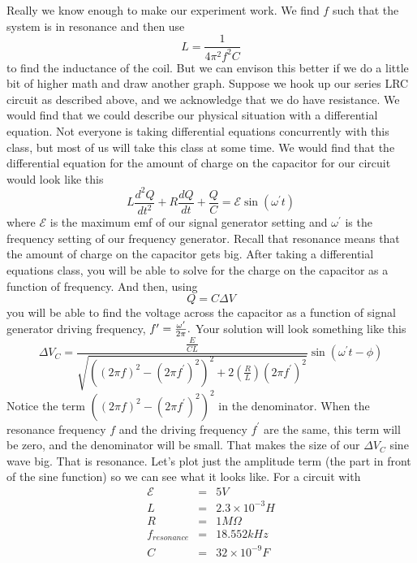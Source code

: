 Really we know enough to make our experiment work. We find $f$ such that
the system is in resonance and then use 
\begin{equation*}
L=\frac{1}{4\pi ^{2}f^{2}C}
\end{equation*}%
to find the inductance of the coil. But we can envison this better if we do
a little bit of higher math and draw another graph. Suppose we hook up our
series LRC circuit as described above, and we acknowledge that we do have
resistance. We would find that we could describe our physical situation with
a differential equation. Not everyone is taking differential equations
concurrently with this class, but most of us will take this class at
some time. We would find that the differential equation for the amount of
charge on the capacitor for our circuit would look like this%
\begin{equation*}
L\frac{d^{2}Q}{dt^{2}}+R\frac{dQ}{dt}+\frac{Q}{C}=\mathcal{E}\sin \left(
\omega ^{\prime }t\right)
\end{equation*}%
where $\mathcal{E}$ is the maximum emf of our signal generator setting and $%
\omega ^{\prime }$ is the frequency setting of our frequency generator. Recall
that resonance means that the amount of charge on the capacitor gets big.
After taking a differential equations class, you will be able to solve for
the charge on the capacitor as a function of frequency. And then, using 
\begin{equation*}
Q=C\Delta V
\end{equation*}%
you will be able to find the voltage across the capacitor as a function of
signal generator driving frequency, $f^{\prime }=\frac{\omega ^{\prime }}{%
2\pi }.$ Your solution will look something like this 
\begin{equation*}
\Delta V_{C}=\frac{\frac{E}{CL}}{\sqrt{\left( \left( 2\pi f
\right) ^{2}-\left( 2\pi f^{\prime }\right) ^{2}\right) ^{2}+2\left( \frac{R%
}{L}\right) \left( 2\pi f^{\prime }\right) ^{2}}}\sin \left( \omega ^{\prime
}t-\phi \right)
\end{equation*}%
Notice the term $\left( \left( 2\pi f\right) ^{2}-\left( 2\pi
f^{\prime }\right) ^{2}\right) ^{2}$ in the denominator. When the resonance
frequency $f$ and the driving frequency $f^{\prime }$ are the same, this
term will be zero, and the denominator will be small. That makes the size of
our $\Delta V_{C}$ sine wave big. That is resonance. Let's plot just the
amplitude term (the part in front of the sine function) so we can see what
it looks like. For a circuit with
\begin{eqnarray*}
\mathcal{E} &=&5\unit{V} \\
L &=&2.3\times 10^{-3}\unit{H} \\
R &=&1\unit{M%
\Omega%
} \\
f_{resonance} &=&18.552\unit{kHz} \\
C &=&32\times 10^{-9}\unit{F}
\end{eqnarray*}%
